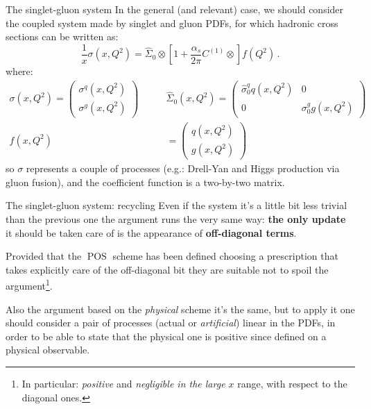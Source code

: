 \documentclass[9pt]{beamer}
\DeclareMathOperator{\pos}{POS}
\begin{document}
\begin{frame}{The singlet-gluon system}
    In the general (and relevant) case, we should consider the coupled system
    made by singlet and gluon PDFs, for which hadronic cross sections can be
    written as:
    \begin{equation*}
        \frac{1}{x} \sigma(x,Q^2)= \hat \Sigma_0\otimes \left[1
        +\frac{\alpha_s}{2\pi}  C^{(1)} \otimes \right] f(Q^2) \,.
    \end{equation*}
    where:
    \begin{align*}
        \sigma(x,Q^2)=\left(\begin{array}{c} \sigma^{q}(x,Q^2)\\ \sigma^{g} (x,Q^2)\end{array}\right) \qquad&
        \hat \Sigma_0(x,Q^2)=\left(\begin{array}{cc} \hat \sigma_0^{q} q (x,Q^2) &
                  0 \\0 & \sigma_0^{g} g (x,Q^2) \end{array}\right)\\
          f(x,Q^2)&=\left(\begin{array}{c} q(x,Q^2) \\ g(x,Q^2) \end{array}\right)
    \end{align*}
    so $\sigma$ represents a couple of processes (e.g.: Drell-Yan and Higgs
    production via gluon fusion), and the coefficient function is a two-by-two
    matrix.
\end{frame}

\begin{frame}{The singlet-gluon system: recycling}
    Even if the system it's a little bit less trivial than the previous one the
    argument runs the very same way: \textbf{the only update} it should be
    taken care of is the appearance of \textbf{off-diagonal terms}.

    Provided that the $\pos$ scheme has been defined choosing a prescription
    that takes explicitly care of the off-diagonal bit they are suitable not to
    spoil the argument\footnote{In particular: \textit{positive} and
    \textit{negligible in the large $x$} range, with respect to the diagonal
    ones.}.

    \vspace*{13pt}
    Also the argument based on the \textit{physical} scheme it's the same, but
    to apply it one should consider a pair of processes (actual or
    \textit{artificial}) linear in the PDFs, in order to be able to state that
    the physical one is positive since defined on a physical observable.
\end{frame}
\end{document}
